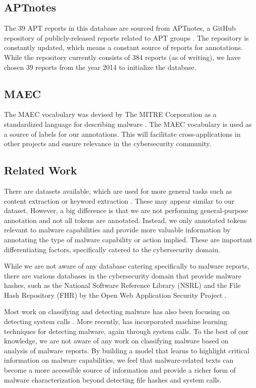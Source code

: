 \documentclass[11pt,a4paper]{article}
\begin{document}
\subsection{APTnotes}

The 39 APT reports in this database are sourced from APTnotes, a GitHub repository of publicly-released reports related to APT groups \cite{Kiran}. The repository is constantly updated, which means a constant source of reports for annotations. While the repository currently consists of 384 reports (as of writing), we have chosen 39 reports from the year 2014 to initialize the database.

\subsection{MAEC}

The MAEC vocabulary was devised by The MITRE Corporation as a standardized language for describing malware \cite{Kirillov:10}. The MAEC vocabulary is used as a source of labels for our annotations. This will facilitate cross-applications in other projects and ensure relevance in the cybersecurity community.





\subsection{Related Work}

There are datasets available, which are used for more general tasks such as content extraction \cite{walker2006} or keyword extraction \cite{Kim:2010}. These may appear similar to our dataset.
However, a big difference is that we are not performing general-purpose annotation and not all tokens are annotated.
Instead, we only annotated tokens relevant to malware capabilities and provide more valuable information by annotating the type of malware capability or action implied.
These are important differentiating factors, specifically catered to the cybersecurity domain.

While we are not aware of any database catering specifically to malware reports, there are various databases in the cybersecurity domain that provide malware hashes, such as the National Software Reference Library (NSRL) \cite{NIST, Mead:06} and the File Hash Repository (FHR) by the Open Web Application Security Project \cite{OWASP}. 

Most work on classifying and detecting malware has also been focusing on detecting system calls \cite{Alazab2010,briones2008,willems2007,qiao2013}. More recently, \citet{rieck2011} has incorporated machine learning techniques for detecting malware, again through system calls. To the best of our knowledge, we are not aware of any work on classifying malware based on analysis of malware reports. By building a model that learns to highlight critical information on malware capabilities, we feel that malware-related texts can become a more accessible source of information and provide a richer form of malware characterization beyond detecting file hashes and system calls.
\end{document}
